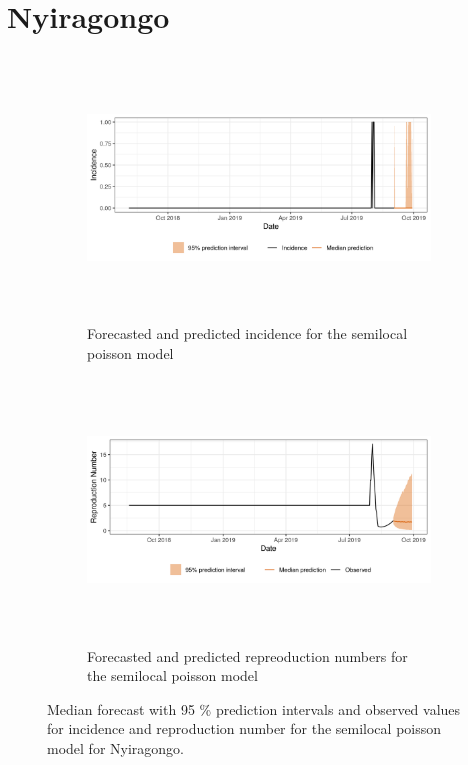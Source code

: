  \section{ Nyiragongo }\begin{figure}[H]\begin{subfigure}{\textwidth}  \centering  \includegraphics[width=0.9\linewidth, height=7cm]{../output/Nyiragongo_predictions.png}  \caption{Forecasted and predicted incidence for the semilocal poisson model}\end{subfigure}

\begin{subfigure}{\textwidth}  \centering  \includegraphics[width=0.9\linewidth, height=7cm]{../output/Nyiragongo_Rs.png}  \caption{Forecasted and predicted repreoduction numbers for the semilocal poisson model}\end{subfigure}  \caption{Median forecast with 95 \% prediction intervals and observed values for incidence and reproduction number for the semilocal poisson model for Nyiragongo.}\end{figure}

